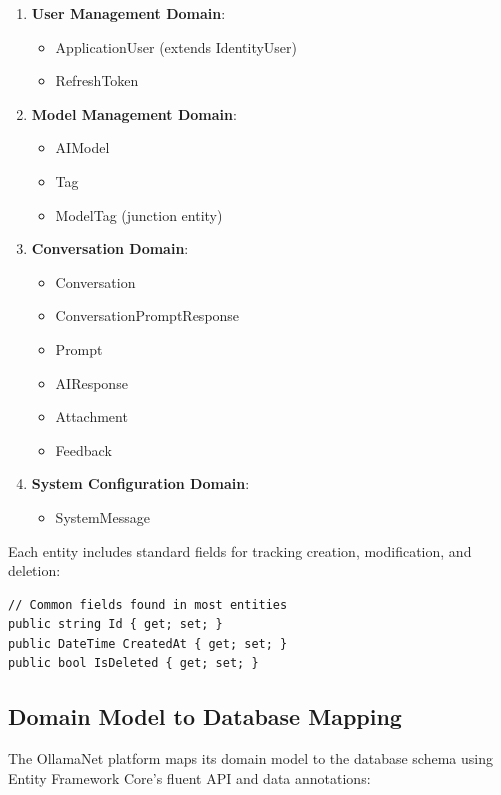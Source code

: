 \begin{enumerate}
   \item \textbf{User Management Domain}:
   \begin{itemize}
      \item ApplicationUser (extends IdentityUser)
      \item RefreshToken
   \end{itemize}

   \item \textbf{Model Management Domain}:
   \begin{itemize}
      \item AIModel
      \item Tag
      \item ModelTag (junction entity)
   \end{itemize}

   \item \textbf{Conversation Domain}:
   \begin{itemize}
      \item Conversation
      \item ConversationPromptResponse
      \item Prompt
      \item AIResponse
      \item Attachment
      \item Feedback
   \end{itemize}

   \item \textbf{System Configuration Domain}:
   \begin{itemize}
      \item SystemMessage
   \end{itemize}
\end{enumerate}

Each entity includes standard fields for tracking creation, modification, and deletion:

\begin{verbatim}
// Common fields found in most entities
public string Id { get; set; }
public DateTime CreatedAt { get; set; }
public bool IsDeleted { get; set; }
\end{verbatim}

\subsection{Domain Model to Database Mapping}

The OllamaNet platform maps its domain model to the database schema using Entity Framework Core's fluent API and data annotations:

